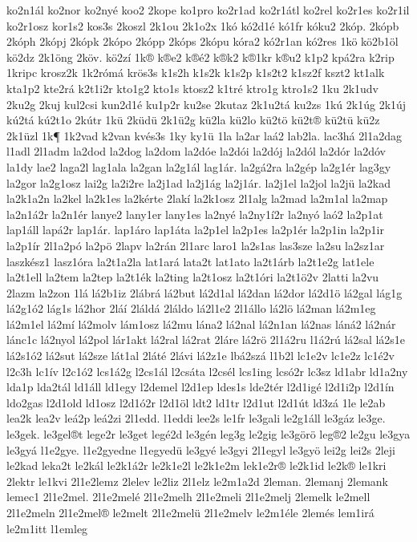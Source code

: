 {ko2n1ál
ko2nor
ko2nyé
koo2
2kope
ko1pro
ko2r1ad
ko2r1átl
ko2rel
ko2r1es
ko2r1il
ko2r1osz
kor1s2
kos3s
2koszl
2k1ou
2k1o2x
1kó
kó2d1é
kó1fr
kóku2
2kóp.
2kópb
2kóph
2kópj
2kópk
2kópo
2kópp
2kóps
2kópu
kóra2
kó2r1an
kó2res
1kö
kö2b1öl
kö2dz
2k1öng
2köv.
kö2zí
1k®
k®e2
k®é2
k®k2
k®1kr
k®u2
k1p2
kpá2ra
k2rip
1kripc
krosz2k
1k2rómá
krös3s
k1s2h
k1s2k
k1s2p
k1s2t2
k1sz2f
kszt2
kt1alk
kta1p2
kte2rá
k2t1i2r
kto1g2
kto1s
ktosz2
k1tré
ktro1g
ktro1s2
1ku
2k1udv
2ku2g
2kuj
kul2csi
kun2d1é
ku1p2r
ku2se
2kutaz
2k1u2tá
ku2zs
1kú
2k1úg
2k1új
kú2tá
kú2t1o
2kútr
1kü
2küdü
2k1ü2g
kü2la
kü2lo
kü2tö
kü2t®
kü2tü
kü2z
2k1üzl
1k¶
1k2vad
k2van
kvés3s
1ky
ky1ü
1la
la2ar
laá2
lab2la.
lac3há
2l1a2dag
l1adl
2l1adm
la2dod
la2dog
la2dom
la2dóe
la2dói
la2dój
la2dól
la2dór
la2dóv
la1dy
lae2
laga2l
lag1ala
la2gan
la2g1ál
lag1ár.
la2gá2ra
la2gép
la2g1ér
lag3gy
la2gor
la2g1osz
lai2g
la2i2re
la2j1ad
la2j1ág
la2j1ár.
la2j1el
la2jol
la2jü
la2kad
la2k1a2n
la2kel
la2k1es
la2kérte
2lakí
la2k1osz
2l1alg
la2mad
la2m1al
la2map
la2n1á2r
la2n1ér
lanye2
lany1er
lany1es
la2nyé
la2ny1í2r
la2nyó
laó2
la2p1at
lap1áll
lapá2r
lap1ár.
lap1áro
lap1áta
la2p1el
la2p1es
la2p1ér
la2p1in
la2p1ir
la2p1ír
2l1a2pó
la2pö
2lapv
la2rán
2l1arc
laro1
la2s1as
las3sze
la2su
la2sz1ar
laszkész1
lasz1óra
la2t1a2la
lat1ará
lata2t
lat1ato
la2t1árb
la2t1e2g
lat1ele
la2t1ell
la2tem
la2tep
la2t1ék
la2ting
la2t1osz
la2t1óri
la2t1ö2v
2latti
la2vu
2lazm
la2zon
1lá
lá2b1iz
2lábrá
lá2but
lá2d1al
lá2dan
lá2dor
lá2d1ö
lá2gal
lág1g
lá2g1ó2
lág1s
lá2hor
2láí
2láldá
2láldo
lá2l1e2
2l1állo
lá2lö
lá2man
lá2m1eg
lá2m1el
lá2mí
lá2molv
lám1osz
lá2mu
lána2
lá2nal
lá2n1an
lá2nas
láná2
lá2nár
lánc1c
lá2nyol
lá2pol
lár1akt
lá2ral
lá2rat
2láre
lá2rö
2l1á2ru
l1á2rú
lá2sal
lá2s1e
lá2s1ó2
lá2sut
lá2sze
lát1al
2láté
2lávi
lá2z1e
lbá2szá
l1b2l
lc1e2v
lc1e2z
lc1é2v
l2c3h
lc1ív
l2c1ó2
lcs1á2g
l2cs1ál
l2csáta
l2csél
lcs1ing
lcsó2r
lc3sz
ld1abr
ld1a2ny
lda1p
lda2tál
ld1áll
ld1egy
l2demel
l2d1ep
ldes1s
lde2tér
l2d1igé
l2d1i2p
l2d1ín
ldo2gas
l2d1old
ld1osz
l2d1ó2r
l2d1öl
ldt2
ld1tr
l2d1ut
l2d1út
ld3zá
1le
le2ab
lea2k
lea2v
leá2p
leá2zi
2l1edd.
l1eddi
lee2s
le1fr
le3gali
le2g1áll
le3gáz
le3ge.
le3gek.
le3gel®t
lege2r
le3get
legé2d
le3gén
leg3g
le2gig
le3görö
leg®2
le2gu
le3gya
le3gyá
l1e2gye.
l1e2gyedne
l1egyedü
le3gyé
le3gyi
2l1egyl
le3gyö
lei2g
lei2s
2leji
le2kad
leka2t
le2kál
le2k1á2r
le2k1e2l
le2k1e2m
lek1e2r®
le2k1id
le2k®
le1kri
2lektr
le1kvi
2l1e2lemz
2lelev
le2liz
2l1elz
le2m1a2d
2leman.
2lemanj
2lemank
lemec1
2l1e2mel.
2l1e2melé
2l1e2melh
2l1e2meli
2l1e2melj
2lemelk
le2mell
2l1e2meln
2l1e2mel®
le2melt
2l1e2melü
2l1e2melv
le2m1éle
2lemés
lem1irá
le2m1itt
l1emleg
}
